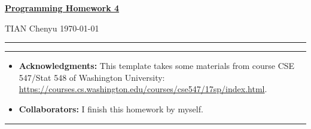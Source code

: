 \documentclass[a4paper]{article}
\begin{document}
\courseheader



\setcounter{hwcnt}{4} %

\begin{center}
  \underline{\bf Programming Homework 4}%
\end{center}
\begin{flushleft}
  TIAN Chenyu\hfill
  \today
\end{flushleft}
\hrule

\vspace{2em}

\flushleft
\rule{\textwidth}{1pt}
\begin{itemize}
\item {\bf Acknowledgments: \/} 
  This template takes some materials from course CSE 547/Stat 548 of Washington University: \small{\url{https://courses.cs.washington.edu/courses/cse547/17sp/index.html}}.
\item {\bf Collaborators: \/}
  I finish this homework by myself.
\end{itemize}
\rule{\textwidth}{1pt}

\vspace{2em}

\end{document}
